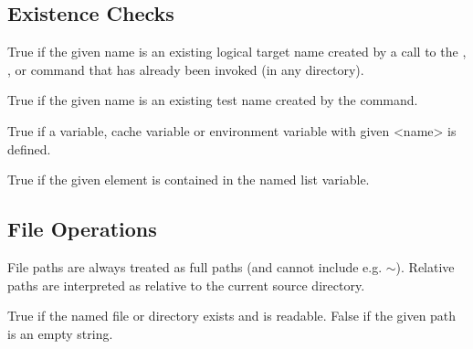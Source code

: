 \subsection{Existence Checks}


\begin{center}  \end{center}
True if the given name is an existing logical target name created by a call to the , , or  command that has already been invoked (in any directory).

\noindent\makebox[\linewidth]{\rule{\columnwidth}{1pt}}
\begin{center}  \end{center}
True if the given name is an existing test name created by the  command.

\noindent\makebox[\linewidth]{\rule{\columnwidth}{1pt}}
\begin{center}  \end{center}
True if a variable, cache variable or environment variable with given <name> is defined.

\noindent\makebox[\linewidth]{\rule{\columnwidth}{1pt}}
\begin{center}  \end{center}
True if the given element is contained in the named list variable.



\subsection{File Operations}
File paths are always treated as full paths (and cannot include e.g. $\sim$). Relative paths are interpreted as relative to the current source directory. \\
\noindent\makebox[\linewidth]{\rule{\columnwidth}{1pt}}
\begin{center}  \end{center}
True if the named file or directory exists and is readable. False if the given path is an empty string.

